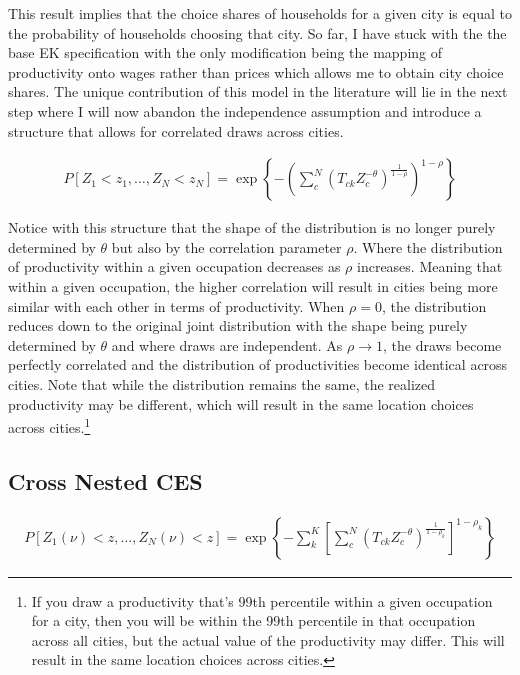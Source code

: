 \documentclass[10pt]{article}
\begin{document}
This result implies that the choice shares of households for a given city is equal to the probability of households choosing that city. So far, I have stuck with the the base EK specification with the only modification being the mapping of productivity onto wages rather than prices which allows me to obtain city choice shares. The unique contribution of this model in the literature will lie in the next step where I will now abandon the independence assumption and introduce a structure that allows for correlated draws across cities.

\begin{align*}
    P[Z_1 < z_1, \dots, Z_N < z_N] = \exp \left\{ - \left( \sum_{c}^{N} (T_{ck} Z_c^{- \theta})^{\frac{1}{1 - \rho}} \right)^{1 - \rho} \right\}
\end{align*}

Notice with this structure that the shape of the distribution is no longer purely determined by $\theta$ but also by the correlation parameter $\rho$. Where the distribution of productivity within a given occupation decreases as $\rho$ increases. Meaning that within a given occupation, the higher correlation will result in cities being more similar with each other in terms of productivity. When $\rho = 0$, the distribution reduces down to the original joint distribution with the shape being purely determined by $\theta$ and where draws are independent. As $\rho \rightarrow 1$, the draws become perfectly correlated and the distribution of productivities become identical across cities. Note that while the distribution remains the same, the realized productivity may be different, which will result in the same location choices across cities.\footnote{If you draw a productivity that's 99th percentile within a given occupation for a city, then you will be within the 99th percentile in that occupation across all cities, but the actual value of the productivity may differ. This will result in the same location choices across cities.}

\subsection{Cross Nested CES}

\begin{align}
    P[Z_1(\nu) < z, \dots, Z_N(\nu) < z] = \exp \left\{ - \sum_{k}^{K} \left[ \sum_{c}^{N} (T_{ck} Z_c^{- \theta})^{\frac{1}{1 - \rho_k}} \right]^{1 - \rho_k} \right\}
\end{align}
\end{document}
